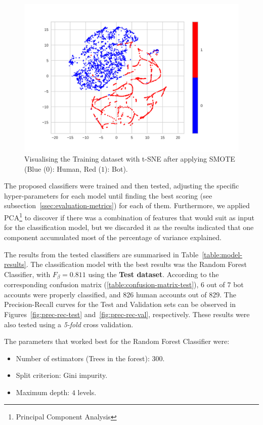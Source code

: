 \documentclass[a4paper, 12pt]{book}
\begin{document}
\begin{figure}
 \centering
  \includegraphics[width=15cm, keepaspectratio]{img/data-tsne-smote.png}
  \caption{Visualising the Training dataset with t-SNE after applying SMOTE (Blue ($0$): Human, Red ($1$): Bot).}
  \label{fig:data-tsne-smote}
\end{figure}

The proposed classifiers were trained and then tested, adjusting the specific hyper-parameters for each model until finding the best scoring (see subsection~\ref{ssec:evaluation-metrics}) for each of them. Furthermore, we applied PCA\footnote{Principal Component Analysis} to discover if there was a combination of features that would suit as input for the classification model, but we discarded it as the results indicated that one component accumulated most of the percentage of variance explained.

The results from the tested classifiers are summarised in Table~\ref{table:model-results}. The classification model with the best results was the Random Forest Classifier, with \textbf{$F_{\beta} = 0.811$} using the \textbf{Test dataset}. According to the corresponding confusion matrix (\ref{table:confusion-matrix-test}), $6$ out of $7$ bot accounts were properly classified, and $826$ human accounts out of $829$. The Precision-Recall curves for the Test and Validation sets can be observed in Figures~\ref{fig:prec-rec-test} and~\ref{fig:prec-rec-val}, respectively. These results were also tested using a \textit{5-fold} cross validation.

The parameters that worked best for the Random Forest Classifier were:
\begin{itemize}
    \item Number of estimators (Trees in the forest): $300$.
    \item Split criterion: Gini impurity.
    \item Maximum depth: $4$ levels.
\end{itemize}
\end{document}
